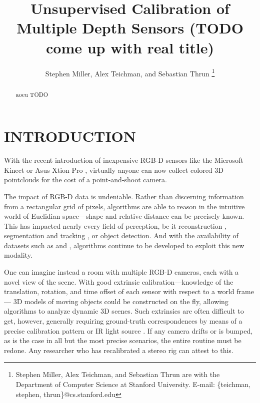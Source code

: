 \documentclass[letterpaper, 10 pt, conference]{ieeeconf}  %
\title{\LARGE \bf
Unsupervised Calibration of Multiple Depth Sensors (TODO come up with real title)}
\author{Stephen Miller, Alex Teichman, and Sebastian Thrun
\thanks{Stephen Miller, Alex Teichman, and Sebastian Thrun are with the Department of Computer Science at Stanford University. \newline E-mail: \{teichman, stephen, thrun\}@cs.stanford.edu } }
\begin{document}
\maketitle
\thispagestyle{empty}
\pagestyle{empty}


\begin{abstract}
aoeu
TODO
\end{abstract}


\section{INTRODUCTION}

With the recent introduction of inexpensive RGB-D sensors like the Microsoft Kinect \cite{kinect} or Asus Xtion Pro \cite{xtion}, virtually anyone 
can now collect colored 3D pointclouds for the cost of a point-and-shoot camera.

The impact of RGB-D data is undeniable. Rather than discerning information from a rectangular grid of pixels, algorithms 
are able to reason in the intuitive world of Euclidian space---shape and relative distance can be precisely known. 
This has impacted nearly every field of perception, be it reconstruction %
, segmentation and tracking %
, or object detection. %
And with the availability of datasets such as \cite{rgbd-dataset} and \cite{nist-dataset}, algorithms continue to 
be developed to exploit this new modality.


One can imagine instead a room with multiple RGB-D cameras, each with a novel view of the scene. With good 
extrinsic calibration---knowledge of the translation, rotation, and time offset of each sensor with respect to a world frame---
3D models of moving objects could be constructed on the fly, allowing algorithms to analyze dynamic 3D scenes. Such extrinsics 
are often difficult to get, however, generally requiring ground-truth correspondences by means of a precise calibration pattern 
\cite{checkerboard} or IR light source \cite{IRlight}. If any camera drifts or is bumped, as is the case in all but the most precise 
scenarios, the entire routine must be redone. Any researcher who has recalibrated a stereo rig can attest to this.
\end{document}
